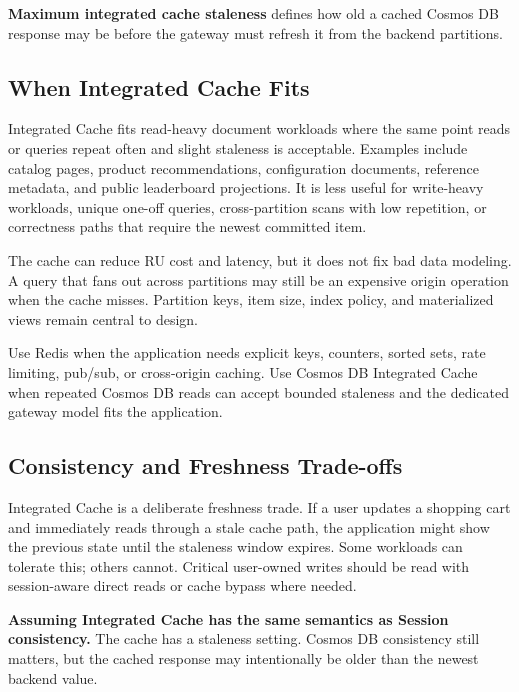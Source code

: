 \begin{definitionbox}
\textbf{Maximum integrated cache staleness} defines how old a cached Cosmos DB response may be before the gateway must refresh it from the backend partitions.
\end{definitionbox}

\subsection{When Integrated Cache Fits}
Integrated Cache fits read-heavy document workloads where the same point reads or queries repeat often and slight staleness is acceptable. Examples include catalog pages, product recommendations, configuration documents, reference metadata, and public leaderboard projections. It is less useful for write-heavy workloads, unique one-off queries, cross-partition scans with low repetition, or correctness paths that require the newest committed item.

The cache can reduce RU cost and latency, but it does not fix bad data modeling. A query that fans out across partitions may still be an expensive origin operation when the cache misses. Partition keys, item size, index policy, and materialized views remain central to design.

\begin{notebox}
Use Redis when the application needs explicit keys, counters, sorted sets, rate limiting, pub/sub, or cross-origin caching. Use Cosmos DB Integrated Cache when repeated Cosmos DB reads can accept bounded staleness and the dedicated gateway model fits the application.
\end{notebox}

\subsection{Consistency and Freshness Trade-offs}
Integrated Cache is a deliberate freshness trade. If a user updates a shopping cart and immediately reads through a stale cache path, the application might show the previous state until the staleness window expires. Some workloads can tolerate this; others cannot. Critical user-owned writes should be read with session-aware direct reads or cache bypass where needed.

\begin{pitfall}
\textbf{Assuming Integrated Cache has the same semantics as Session consistency.} The cache has a staleness setting. Cosmos DB consistency still matters, but the cached response may intentionally be older than the newest backend value.
\end{pitfall}

